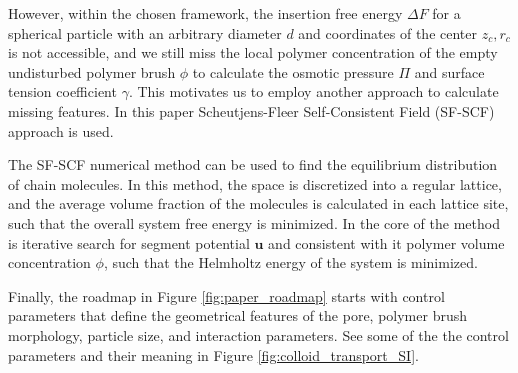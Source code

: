 \documentclass[10pt, a4paper]{article}
\begin{document}
\begin{multicols}{2}
However, within the chosen framework, the insertion free energy $\Delta F$ for a spherical particle with an arbitrary diameter $d$ and coordinates of the center $z_c, r_c$ is not accessible, and we still miss the local polymer concentration of the empty undisturbed polymer brush $\phi$ to calculate the osmotic pressure $\Pi$ and surface tension coefficient $\gamma$.
This motivates us to employ another approach to calculate missing features. 
In this paper Scheutjens-Fleer Self-Consistent Field (SF-SCF) approach is used.

The SF-SCF numerical method can be used to find the equilibrium distribution of chain molecules.
In this method, the space is discretized into a regular lattice, and the average volume fraction of the molecules is calculated in each lattice site, such that the overall system free energy is minimized.
In the core of the method is iterative search for segment potential $\mathbf{u}$ and consistent with it polymer volume concentration $\phi$, such that the Helmholtz energy of the system is minimized.

Finally, the roadmap in Figure \ref{fig:paper_roadmap} starts with control parameters that define the geometrical features of the pore, polymer brush morphology, particle size, and interaction parameters.
See some of the the control parameters and their meaning in Figure \ref{fig:colloid_transport_SI}.


\end{multicols}

\end{document}
